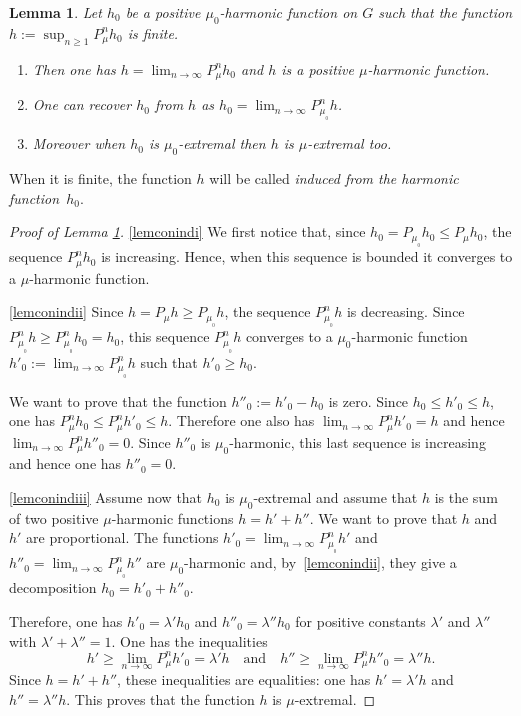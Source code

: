 \documentclass[JEP,XML,SOM,Unicode]{cedram}
\newenvironment{enumeratei}
{\bgroup\def\theenumi{\roman{enumi}}\def\theenumii{\arabic{enumii}}\begin{enumerate}}
{\end{enumerate}\egroup}
\newtheorem{Lem}[Thm]{Lemma}
\theoremstyle{definition}
\let\la\lambda
\let\ra\to
\begin{document}
\begin{Lem}
\label{lemconind}
Let $h_0$ be a positive $\mu_0$-harmonic function on $G$ such that
the function $h:=\sup_{n\geq 1}P^n_{\mu}h_0$ is finite.
\begin{enumeratei}
\item\label{lemconindi}
Then
one has
$h=\lim_{n\ra\infty}P^n_{\mu}h_0$ and
$h$ is a positive $\mu$-harmonic function.
\item\label{lemconindii}
One can recover $h_0$ from $h$ as
$h_0=\lim_{n\ra\infty}P^n_{\mu_{_0}}h$.
\item\label{lemconindiii}
Moreover when $h_0$ is $\mu_0$-extremal then $h$ is $\mu$-extremal too.
\end{enumeratei}
\end{Lem}

When it is finite, the function $h$ will be called \emph{induced from the harmonic function~$h_0$}.

\skpt
\begin{proof}[Proof of Lemma \ref{lemconind}]

\eqref{lemconindi}
We first notice that, since $h_0=P_{\mu_{_0}}h_0\leq P_\mu h_0$,
the sequence $P^n_\mu h_0$ is increasing.
Hence, when this sequence is bounded it converges to a $\mu$-harmonic function.

\eqref{lemconindii}
Since $h\!=\!P_{\mu}h\!\geq\!P_{\mu_{_0}} h$,
the sequence $P^n_{\mu_{_0}} h$ is decreasing.
Since \hbox{$P_{\mu_{_0}}^n h\!\geq\!P_{\mu_{_0}}^n h_0\!=\!h_0$}, this sequence $P^n_{\mu_{_0}} h$
converges to a $\mu_0$-harmonic function
$h'_0:=\lim_{n\ra\infty}P^n_{\mu_{_0}}h$ such that
$h'_0\geq h_0$.

We want to prove that the function $h''_0:= h'_0-h_0$ is zero.
Since $h_0\leq h'_0\leq h$, one has
$P^n_\mu h_0\leq P^n_\mu h'_0\leq h$.
Therefore one also has
$\lim_{n\ra\infty}P^n_{\mu}h'_0=h$
and hence
$\lim_{n\ra\infty}P^n_{\mu}h''_0=0$.
Since $h''_0$ is $\mu_0$-harmonic, this last sequence is increasing
and hence one has $h''_0=0$.

\eqref{lemconindiii}
Assume now that $h_0$ is $\mu_0$-extremal and assume that
$h$ is the sum of two positive $\mu$-harmonic functions
$h=h'+h''$. We want to prove that $h$ and $h'$ are proportional.
The functions
$h'_0=\lim_{n\ra\infty}P^n_{\mu_{_0}}h'$
and
$h''_0=\lim_{n\ra\infty}P^n_{\mu_{_0}}h''$
are $\mu_0$-harmonic and, by~\eqref{lemconindii}, they give a decomposition
$h_0=h'_0+h''_0$.

Therefore,
one has $h'_0=\la' h_0$ and $h''_0=\la'' h_0$
for positive constants $\la'$ and $\la''$ with $\la'+\la''=1$.
One has the inequalities
\[
h'\geq\lim_{n\ra\infty}P^n_{\mu}h'_0 =\la' h\quad\text{and}
\quad h''\geq\lim_{n\ra\infty}P^n_{\mu}h''_0 =\la'' h.
\]
Since $h=h'+h''$, these inequalities are equalities: one has
$h'=\la' h$ and $h''=\la'' h$.
This proves that the function $h$ is $\mu$-extremal.
\end{proof}
\end{document}
